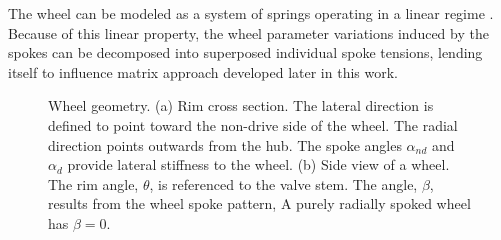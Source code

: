 \documentclass[journal]{IEEEtran}
\begin{document}
The wheel can be modeled as a system of springs operating in a linear regime \cite{FordThesis}. Because of this linear property, the wheel parameter variations induced by the spokes can be decomposed into superposed individual spoke tensions, lending itself to influence matrix approach developed later in this work.

\begin{figure}[!t]
\centering
    \caption{Wheel geometry. (a)  Rim cross section.  The lateral direction is defined to point toward the non-drive side of the wheel.  The radial direction points outwards from the hub.  The spoke angles $\alpha_{{nd}}$ and $\alpha_{{d}}$ provide lateral stiffness to the wheel. (b) Side view of a wheel. The rim angle, $\theta$, is referenced to the valve stem.  The angle, $\beta$, results from the wheel spoke pattern,  A purely radially spoked wheel has $\beta = 0$.}
    \label{fig:geom}
    \end{figure}
\end{document}

